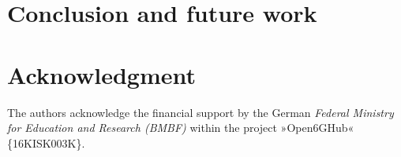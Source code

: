 



\section{Conclusion and future work}
\label{sec:Concl}




%
%
\section*{Acknowledgment}%

The authors acknowledge the financial support by the German \textit{Federal Ministry for Education and Research (BMBF)} within the project »Open6GHub« \{16KISK003K\}.
%



